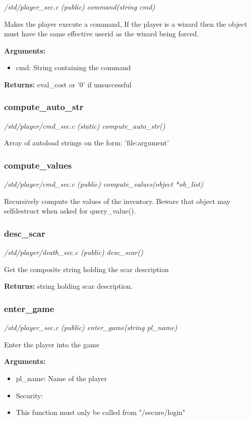 {\em /std/player\_sec.c (public) command(string cmd)}

Makes the player execute a command, If the player is a
wizard then the object must have the same effective
userid as the wizard being forced.

{\bf Arguments:}
\begin{itemize}
\item       cmd: String containing the command
\end{itemize}

{\bf Returns:}      eval\_cost or '0' if unsuccessful


\subsubsection{compute\_auto\_str}

{\em /std/player/cmd\_sec.c (static) compute\_auto\_str()}

Array of autoload strings on the form: 'file:argument'


\subsubsection{compute\_values}

{\em /std/player/cmd\_sec.c (public) compute\_values(object *ob\_list)}

Recursively compute the values of the inventory.
Beware that object may selfdestruct when asked for query\_value().


\subsubsection{desc\_scar}

{\em /std/player/death\_sec.c (public) desc\_scar()}

Get the composite string holding the scar description

{\bf Returns:}        string holding scar description.


\subsubsection{enter\_game}

{\em /std/player\_sec.c (public) enter\_game(string pl\_name)}

Enter the player into the game

{\bf Arguments:}
\begin{itemize}
\item     pl\_name: Name of the player
\item Security:
\item This function must only be called from "/secure/login"
\end{itemize}


